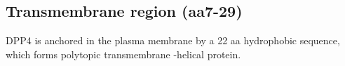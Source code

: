 \subsection{Transmembrane region (aa7-29)}

DPP4 is anchored in the plasma membrane by a 22 aa hydrophobic sequence, which forms polytopic transmembrane \alpha -helical protein. \cite{Hong_1990}